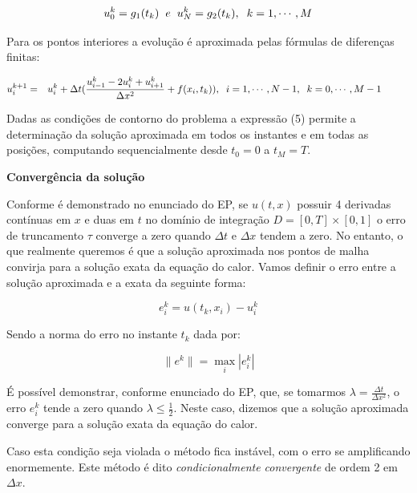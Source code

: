 \documentclass[a4paper, 12pt]{article}
\begin{document}
$$ u_{0}^k	= g_{1}(t_{k}) \hspace{0.2cm} e \hspace{0.2cm} u_{N}^k	= g_{2}(t_{k}), \hspace{0.2cm} k=1,\cdots,M	$$

Para os pontos interiores a evolução é aproximada pelas fórmulas de diferenças finitas:

\begin{eqnarray}
u_{i}^{k+1} & = & u_{i}^{k} + \Delta t (\frac{u_{i-1}^{k}-2u_{i}^{k}+u_{i+1}^{k}}{\Delta x^2}+f(x_i,t_k)), \hspace{0.2cm} i=1,\cdots,N-1, \hspace{0.2cm} k=0,\cdots,M-1 \hspace{1cm}
\end{eqnarray}

Dadas as condições de contorno do problema a expressão (5) permite a determinação da solução aproximada em todos os instantes e em todas as posições, computando sequencialmente desde $t_0=0$ a $t_M=T$. 

\textbf{Convergência da solução}

Conforme é demonstrado no enunciado do EP, se $u(t,x)$ possuir 4 derivadas contínuas em $x$ e duas em $t$ no domínio de integração $D=[0,T] \times [0,1]$ o erro de truncamento $\tau$ converge a zero quando $\Delta t$ e $\Delta x$ tendem a zero. No entanto, o que realmente queremos é que a solução aproximada nos pontos de malha convirja para a solução exata da equação do calor. Vamos definir o erro entre a solução aproximada e a exata da seguinte forma:

\begin{equation}
e_i^k = u(t_k,x_i) - u_i^k
\end{equation}

Sendo a norma do erro no instante $t_k$ dada por:

\begin{equation}
\|e^k\| = \max_{i}|e_i^k| 
\end{equation}

É possível demonstrar, conforme enunciado do EP, que, se tomarmos $\lambda = \frac{\Delta t}{\Delta x^2}$, o erro $e_i^k$ tende a zero quando $\lambda \leq \frac{1}{2}$. Neste caso, dizemos que a solução aproximada converge para a solução exata da equação do calor. 

Caso esta condição seja violada o método fica instável, com o erro se amplificando enormemente. Este método é dito \textit{condicionalmente convergente} de ordem 2 em $\Delta x$.
\end{document}
